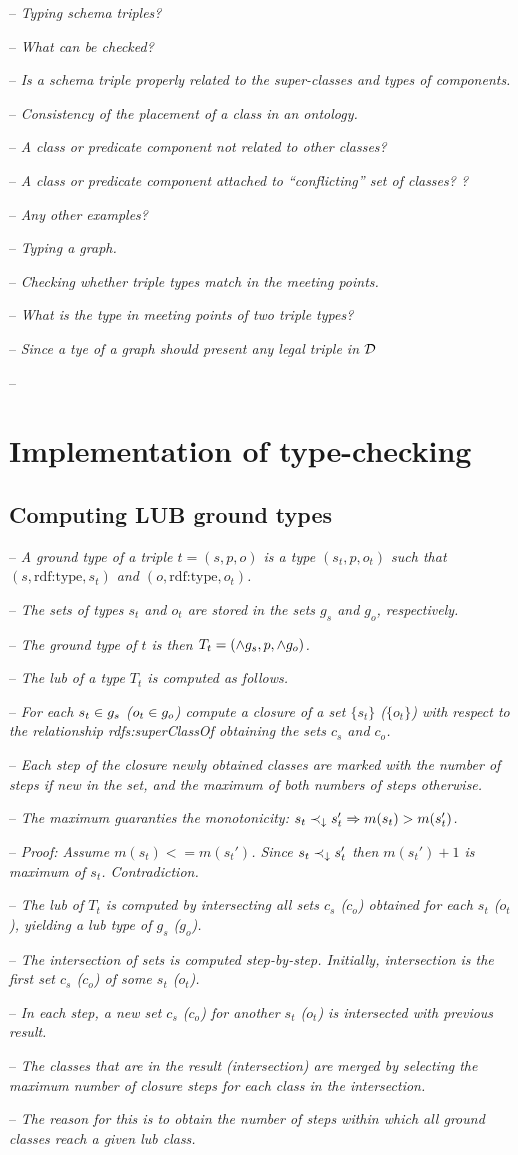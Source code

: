 \documentclass[runningheads]{llncs}
\newcommand{\darr}{\downarrow}
\newcommand{\notes}[1]{\noindent\begin{small}-- \emph{#1}\\\end{small}}
\newcommand{\nnotes}[1]{\indent\begin{small}-- \emph{#1}\\\end{small}}
\begin{document}
\notes{Typing schema triples?}
\nnotes{What can be checked?}
\nnotes{Is a schema triple properly related to the super-classes and types of components.}
\nnotes{Consistency of the placement of a class in an ontology.}
\nnotes{A class or predicate component not related to other classes?}
\nnotes{A class or predicate component attached to ``conflicting'' set of classes? ?}
\nnotes{Any other examples?}

\notes{Typing a graph.}
\nnotes{Checking whether triple types match in the meeting points.}
\nnotes{What is the type in meeting points of two triple types?}
\nnotes{Since a tye of a graph should present any legal triple in ${\cal D}$}
\nnotes{}


\section{Implementation of type-checking}


\subsection{Computing LUB ground types}

\notes{A ground type of a triple $t=(s,p,o)$ is a type $(s_t,p,o_t)$ such that $(s,\text{rdf:type},s_t)$ and $(o,\text{rdf:type},o_t)$.}
\notes{The sets of types $s_t$ and $o_t$ are stored in the sets $g_s$ and $g_o$, respectively.}
\notes{The ground type of $t$ is then $T_t=(\land\/g_s,p,\land\/g_o)$.}
\notes{The lub of a type $T_t$ is computed as follows.}

\notes{For each $s_t\in\/g_s$ ($o_t\in\/g_o$) compute a closure of a set $\{s_t\}$ ($\{o_t\}$) with respect to the relationship rdfs:superClassOf obtaining the sets $c_s$ and $c_o$.}
\notes{Each step of the closure newly obtained classes are marked with the number of steps if new in the set, and the maximum of both numbers of steps otherwise.}
\notes{The maximum guaranties the monotonicity: $s_t\prec_\darr\/s_t'\Rightarrow\/m(s_t)>m(s_t')$.}
\notes{Proof: Assume $m(s_t)<=m(s_t')$. Since $s_t\prec_\darr\/s_t'$ then $m(s_t')+1$ is maximum of $s_t$. Contradiction.}

\notes{The lub of $T_t$ is computed by intersecting all sets $c_s$ ($c_o$) obtained for each $s_t$ ($o_t$), yielding a lub type of $g_s$ ($g_o$).}
\notes{The intersection of sets is computed step-by-step. Initially, intersection is the first set $c_s$ ($c_o$) of some $s_t$ ($o_t$).}
\notes{In each step, a new set $c_s$ ($c_o$) for another $s_t$ ($o_t$) is intersected with previous result.}
\notes{The classes that are in the result (intersection) are merged by selecting the maximum number of closure steps for each class in the intersection.}
\notes{The reason for this is to obtain the number of steps within which all ground classes reach a given lub class.}
\end{document}
